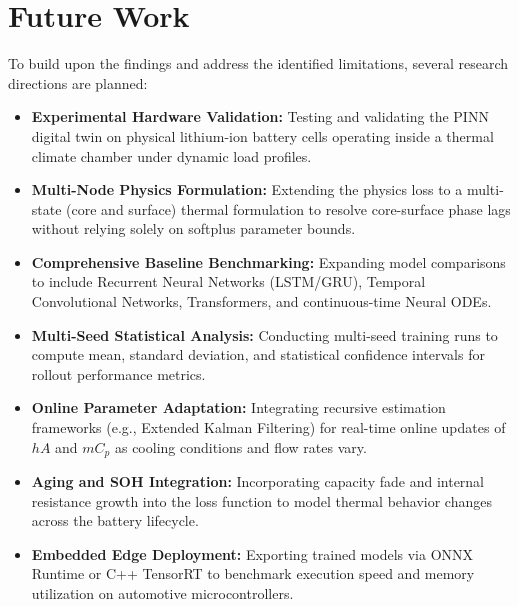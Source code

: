 \section{Future Work}

To build upon the findings and address the identified limitations, several research directions are planned:
\begin{itemize}
    \item \textbf{Experimental Hardware Validation:} Testing and validating the PINN digital twin on physical lithium-ion battery cells operating inside a thermal climate chamber under dynamic load profiles.
    \item \textbf{Multi-Node Physics Formulation:} Extending the physics loss to a multi-state (core and surface) thermal formulation to resolve core-surface phase lags without relying solely on softplus parameter bounds.
    \item \textbf{Comprehensive Baseline Benchmarking:} Expanding model comparisons to include Recurrent Neural Networks (LSTM/GRU), Temporal Convolutional Networks, Transformers, and continuous-time Neural ODEs.
    \item \textbf{Multi-Seed Statistical Analysis:} Conducting multi-seed training runs to compute mean, standard deviation, and statistical confidence intervals for rollout performance metrics.
    \item \textbf{Online Parameter Adaptation:} Integrating recursive estimation frameworks (e.g., Extended Kalman Filtering) for real-time online updates of $hA$ and $m C_p$ as cooling conditions and flow rates vary.
    \item \textbf{Aging and SOH Integration:} Incorporating capacity fade and internal resistance growth into the loss function to model thermal behavior changes across the battery lifecycle.
    \item \textbf{Embedded Edge Deployment:} Exporting trained models via ONNX Runtime or C++ TensorRT to benchmark execution speed and memory utilization on automotive microcontrollers.
\end{itemize}
